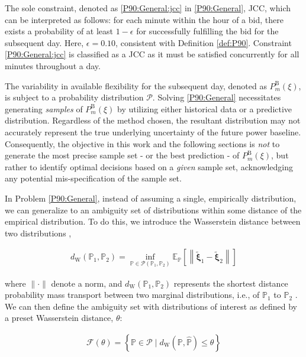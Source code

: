 \documentclass[conference]{IEEEtran}
\begin{document}
The sole constraint, denoted as \eqref{P90:General:jcc} in \eqref{P90:General}, \ac{JCC}, which can be interpreted as follows: for each minute within the hour of a bid, there exists a probability of at least $1-\epsilon$ for successfully fulfilling the bid for the subsequent day. Here, $\epsilon = 0.10$, consistent with Definition \ref{def:P90}. Constraint \eqref{P90:General:jcc} is classified as a \ac{JCC} as it must be satisfied concurrently for all minutes throughout a day.

The variability in available flexibility for the subsequent day, denoted as $P_{m}^{\text{B}}(\xi)$, is subject to a probability distribution $\mathcal{P}$. Solving \eqref{P90:General} necessitates generating \textit{samples} of $P_{m}^{\text{B}}(\xi)$ by utilizing either historical data or a predictive distribution. Regardless of the method chosen, the resultant distribution may not accurately represent the true underlying uncertainty of the future power baseline. Consequently, the objective in this work and the following sections is \textit{not} to generate the most precise sample set - or the best prediction - of $P_{m}^{\text{B}}(\xi)$, but rather to identify optimal decisions based on a \textit{given} sample set, acknowledging any potential mis-specification of the sample set.

In Problem  \eqref{P90:General}, instead of assuming a single, empirically distribution, we can generalize to an ambiguity set of distributions within some distance of the empirical distribution. To do this, we introduce the Wasserstein distance between two distributions \cite{chen2022data},

\begin{align}\label{was}
    d_{\mathrm{W}}\left(\mathbb{P}_1, \mathbb{P}_2\right)=\inf _{\mathbb{P} \in \mathcal{P}\left(\mathbb{P}_1, \mathbb{P}_2\right)} \mathbb{E}_{\mathbb{P}}\left[\left\|\tilde{\boldsymbol{\xi}}_1-\tilde{\boldsymbol{\xi}}_2\right\|\right]
\end{align}

where $\|\cdot\|$ denote a norm, and $d_{\mathrm{W}}\left(\mathbb{P}_1, \mathbb{P}_2\right)$ represents the shortest distance probability mass transport between two marginal distributions, i.e., of $\mathbb{P}_1$ to $\mathbb{P}_2$ \cite{mohajerin2018data}. We can then define the ambiguity set with distributions of interest as defined by a preset Wasserstein distance, $\theta$:

\begin{align}\label{amb-set}
    \mathcal{F}(\theta)=\left\{\mathbb{P} \in \mathcal{P} \mid d_{\mathrm{W}}(\mathbb{P}, \hat{\mathbb{P}}) \leq \theta\right\}
\end{align}
\end{document}
